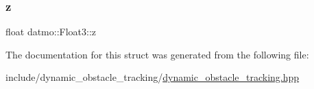 \subsubsection{\texorpdfstring{z}{z}}
{\footnotesize\ttfamily float datmo\+::\+Float3\+::z}



The documentation for this struct was generated from the following file\+:\begin{DoxyCompactItemize}
\item 
include/dynamic\+\_\+obstacle\+\_\+tracking/\hyperlink{dynamic__obstacle__tracking_8hpp}{dynamic\+\_\+obstacle\+\_\+tracking.\+hpp}\end{DoxyCompactItemize}
